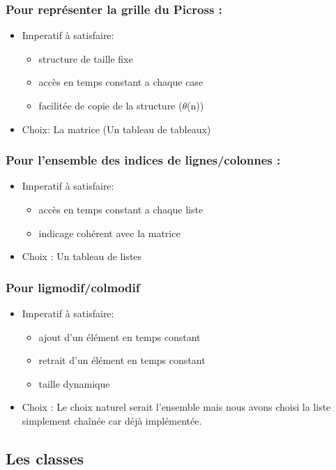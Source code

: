 \documentclass{article}
\begin{document}
\subsubsection{Pour représenter la grille du Picross :}
\begin{itemize}
\item Imperatif à satisfaire:
\begin{itemize}
\item structure de taille fixe
\item accès en temps constant a chaque case
\item facilitée de copie de la structure ($\theta$(n))
\end{itemize}
\item Choix: La matrice (Un tableau de tableaux)
\end{itemize}
\subsubsection{Pour l'ensemble des indices de lignes/colonnes :}
\begin{itemize}
\item Imperatif à satisfaire:
\begin{itemize}
\item accès en temps constant a chaque liste
\item indicage cohérent avec la matrice
\end{itemize}
\item Choix : Un tableau de listes
\end{itemize}
\subsubsection{Pour ligmodif/colmodif}
\begin{itemize}
\item Imperatif à satisfaire:
\begin{itemize}
\item ajout d'un élément en temps constant
\item retrait d'un élément en temps constant
\item taille dynamique
\end{itemize}
\item Choix :
Le choix naturel serait l'ensemble mais nous avons choisi la liste simplement chaînée car déjà implémentée.
\end{itemize}
\subsection{Les classes}
\end{document}
